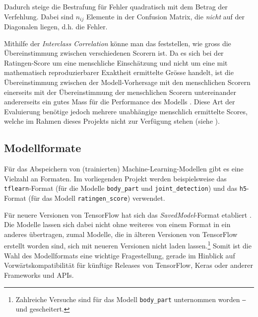 Dadurch steige die Bestrafung für Fehler quadratisch mit dem Betrag der Verfehlung. Dabei sind $n_{ij}$ Elemente in der Confusion Matrix, die \textit{nicht} auf der Diagonalen liegen, d.h. die Fehler.

Mithilfe der \textit{Interclass Correlation} könne man das feststellen, wie gross die Übereinstimmung zwischen verschiedenen Scorern ist. Da es sich bei der Ratingen-Score um eine menschliche Einschätzung und nicht um eine mit mathematisch reproduzierbarer Exaktheit ermittelte Grösse handelt, ist die Übereinstimmung zwischen der Modell-Vor\-her\-sage mit den menschlichen Scorern einerseits mit der Übereinstimmung der menschlichen Scorern untereinander andererseits ein gutes Mass für die Performance des Modells \cite[ebd.]{rohrbach2019}. Diese Art der Evaluierung benötige jedoch mehrere unabhängige menschlich ermittelte Scores, welche im Rahmen dieses Projekts nicht zur Verfügung stehen (siehe ).

\subsection{Modellformate}
\label{sec:modellformate}

Für das Abspeichern von (trainierten) Machine-Learning-Modellen gibt es eine Vielzahl an Formaten. Im vorliegenden Projekt werden beispielsweise das \texttt{tflearn}-Format (für die Modelle \texttt{body\_part} und \texttt{joint\_detection}) und das \texttt{h5}-Format (für das Modell \texttt{ratingen\_score}) verwendet. 

Für neuere Versionen von TensorFlow hat sich das \textit{SavedModel}-Format etabliert \cite[Kapitel 19]{géron2019}. Die Modelle lassen sich dabei nicht ohne weiteres von einem Format in ein anderes übertragen, zumal Modelle, die in älteren Versionen von TensorFlow erstellt worden sind, sich mit neueren Versionen nicht laden lassen.\footnote{Zahlreiche Versuche sind für das Modell \texttt{body\_part} unternommen worden ‒ und gescheitert.} Somit ist die Wahl des Modellformats eine wichtige Fragestellung, gerade im Hinblick auf Vorwärtskompatibilität für künftige Releases von TensorFlow, Keras oder anderer Frameworks und APIs.

